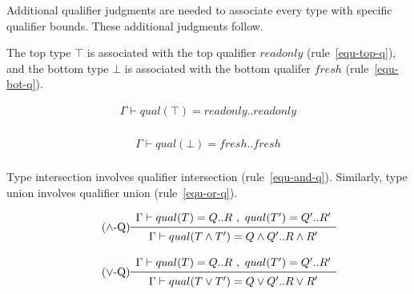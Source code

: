 Additional qualifier judgments are needed to associate every type with
specific qualifier bounds. These additional judgments follow.

The top type $\top$ is associated with the top qualifier \mbox{$readonly$} (rule~\ref{equ-top-q}),
and the bottom type $\bot$ is associated with the bottom qualifer \mbox{$fresh$} (rule~\ref{equ-bot-q}).

\begin{equation*}\tag{$\top$-Q}\label{equ-top-q}
\begin{array}{c}
\Gamma \vdash qual(\top)=readonly..readonly \\
\end{array}
\end{equation*}

\vspace{0.4cm}

\begin{equation*}\tag{$\bot$-Q}\label{equ-bot-q}
\begin{array}{c}
\Gamma \vdash qual(\bot)=fresh..fresh \\
\end{array}
\end{equation*}

\vspace{0.4cm}

Type intersection involves qualifier intersection (rule~\ref{equ-and-q}).
Similarly, type union involves qualifier union (rule~\ref{equ-or-q}).

\begin{equation*}\tag{$\land$-Q}\label{equ-and-q}
\begin{array}{c}
\Gamma \vdash qual(T)=Q..R\ ,\ qual(T')=Q'..R' \\
\midrule
\Gamma \vdash qual(T \land T')=Q \land Q' .. R \land R' \\
\end{array}
\end{equation*}

\vspace{0.4cm}

\begin{equation*}\tag{$\lor$-Q}\label{equ-or-q}
\begin{array}{c}
\Gamma \vdash qual(T)=Q..R\ ,\ qual(T')=Q'..R' \\
\midrule
\Gamma \vdash qual(T \lor T')=Q \lor Q' .. R \lor R' \\
\end{array}
\end{equation*}

